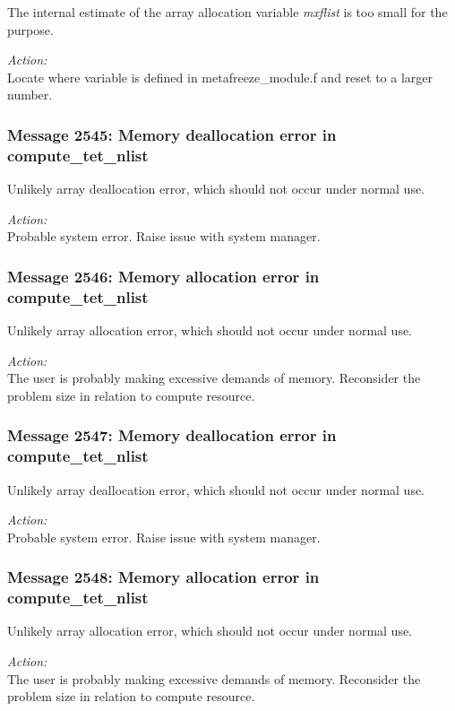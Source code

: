 The internal estimate of the array allocation variable {\em mxflist} is too
small for the purpose.

\noindent
{\em Action:}\\ Locate where variable is defined in metafreeze\_module.f and
reset to a larger number.

\subsubsection*{Message 2545: Memory deallocation error in compute\_tet\_nlist}

Unlikely array deallocation error, which should not occur under normal use.

\noindent
{\em Action:}\\ Probable system error. Raise issue with system manager.
          
\subsubsection*{Message 2546: Memory allocation error in compute\_tet\_nlist}

Unlikely array allocation error, which should not occur under normal use.

\noindent
{\em Action:}\\ The user is probably making excessive demands of
memory. Reconsider the problem size in relation to compute resource.
          
\subsubsection*{Message 2547: Memory deallocation error in compute\_tet\_nlist}

Unlikely array deallocation error, which should not occur under normal use.

\noindent
{\em Action:}\\ Probable system error. Raise issue with system manager.
          
\subsubsection*{Message 2548: Memory allocation error in compute\_tet\_nlist}

Unlikely array allocation error, which should not occur under normal use.

\noindent
{\em Action:}\\ The user is probably making excessive demands of
memory. Reconsider the problem size in relation to compute resource.
